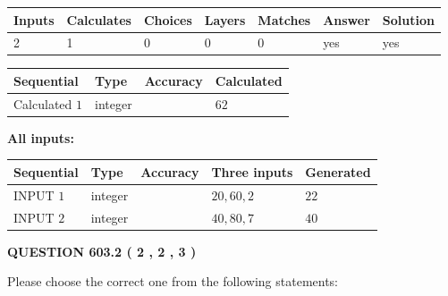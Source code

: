 \documentclass[12pt]{article}
\begin{document}
 
\noindent{}
 
 

 
   
   
   
   
\noindent\begin{tabular}{|l|l|l|l|l|l|l|}
 \hline
Inputs & Calculates & Choices & Layers & Matches & Answer & Solution \\ \hline
 2  & 
 1  & 
 0
  & 
 0  & 
 0  & 
  yes & 
  yes 
  \\ \hline
 \end{tabular}
   
   
   
   
\noindent{}
   
   
  
  
\noindent\begin{tabular}{|l|l|l|l|}
\hline
 Sequential & Type & Accuracy & Calculated \\ 
\hline
 
 
  Calculated $  1 $ & integer &  & 
  $ 62 $ 
 \\  \hline  
 \end{tabular}
   
   
   
   
\noindent\vspace{0.1in}\hspace{-0.08in} {\textbf{\Large{All inputs: }}}
   
   
  
  
\noindent\begin{tabular}{|l|l|l|l|l|}
\hline
 Sequential & Type & Accuracy & Three inputs & Generated \\ 
\hline
 
 
  INPUT $  1 $ & integer &  & $
 20
 , 
 60
 , 
 2
 $ & $ 22 $ 
 \\  \hline  
 
 
  INPUT $  2 $ & integer &  & $
 40
 , 
 80
 , 
 7
 $ & $ 40 $ 
 \\  \hline  
 \end{tabular}
   
   
  
\vspace{0.2in}
  
{\textbf{\Large{QUESTION
603.2 
 ( 2 , 2 , 3 )
}}}
  
  
Please choose the correct one from the following statements:
 
\end{document}

